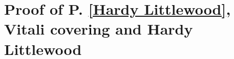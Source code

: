 {%



\section{Proof of P. \ref{Hardy Littlewood}, Vitali covering and Hardy Littlewood}
\label{sec hlm}

}
